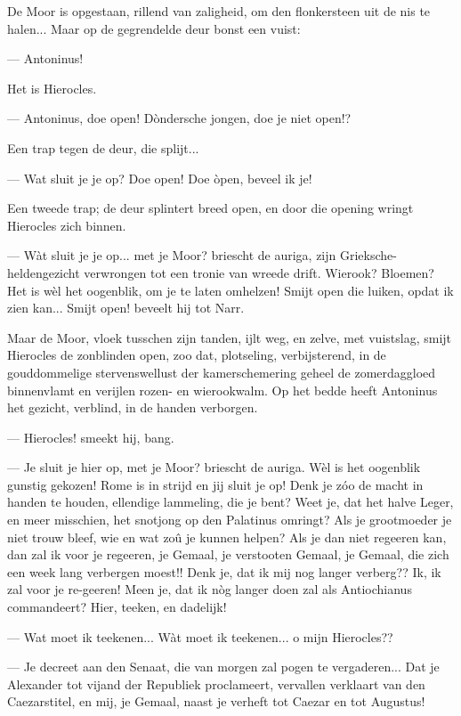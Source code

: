 \documentclass[a4paper, 12pt, oneside, dutch]{article}
\begin{document}
De Moor is opgestaan, rillend van zaligheid, om den flonkersteen uit de nis te halen... Maar op de gegrendelde deur bonst een vuist:

--- Antoninus!

Het is Hierocles.

--- Antoninus, doe open! Dòndersche jongen, doe je niet open!?

Een trap tegen de deur, die splijt...

--- Wat sluit je je op? Doe open! Doe òpen, beveel ik je!

Een tweede trap; de deur splintert breed open, en door die opening wringt Hierocles zich binnen.

--- Wàt sluit je je op... met je Moor? briescht de auriga, zijn Grieksche-heldengezicht verwrongen tot een tronie van wreede drift. Wierook? Bloemen? Het is wèl het oogenblik, om je te laten omhelzen! Smijt open die luiken, opdat ik zien kan... Smijt open! beveelt hij tot Narr.

Maar de Moor, vloek tusschen zijn tanden, ijlt weg, en zelve, met vuistslag, smijt Hierocles de zonblinden open, zoo dat, plotseling, verbijsterend, in de gouddommelige stervenswellust der kamerschemering geheel de zomerdaggloed binnenvlamt en verijlen rozen- en wierookwalm. Op het bedde heeft Antoninus het gezicht, verblind, in de handen verborgen.

--- Hierocles! smeekt hij, bang.

--- Je sluit je hier op, met je Moor? briescht de auriga. Wèl is het oogenblik gunstig gekozen! Rome is in strijd en jij sluit je op! Denk je zóo de macht in handen te houden, ellendige lammeling, die je bent? Weet je, dat het halve Leger, en meer misschien, het snotjong op den Palatinus omringt? Als je grootmoeder je niet trouw bleef, wie en wat zoû je kunnen helpen? Als je dan niet regeeren kan, dan zal ik voor je regeeren, je Gemaal, je verstooten Gemaal, je Gemaal, die zich een week lang verbergen moest!! Denk je, dat ik mij nog langer verberg?? Ik, ik zal voor je re-geeren! Meen je, dat ik nòg langer doen zal als Antiochianus commandeert? Hier, teeken, en dadelijk!

--- Wat moet ik teekenen... Wàt moet ik teekenen... o mijn Hierocles??

--- Je decreet aan den Senaat, die van morgen zal pogen te vergaderen... Dat je Alexander tot vijand der Republiek proclameert, vervallen verklaart van den Caezarstitel, en mij, je Gemaal, naast je verheft tot Caezar en tot Augustus!
\end{document}
